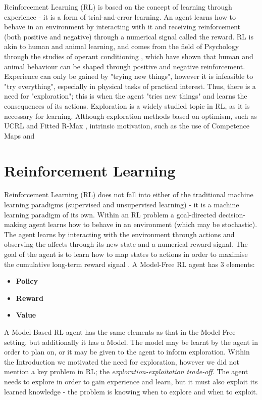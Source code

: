 Reinforcement Learning (RL) is based on the concept of learning through experience - it is a form of trial-and-error learning. An agent learns how to behave in an environment by interacting with it and receiving reinforcement (both positive and negative) through a numerical signal called the reward. RL is akin to human and animal learning, and comes from the field of Psychology through the studies of operant conditioning \cite{nla.cat-vn2770732}, which have shown that human and animal behaviour can be shaped through positive and negative reinforcement.
\\Experience can only be gained by "trying new things", however it is infeasible to "try everything", especially in physical tasks of practical interest. Thus, there is a need for "exploration"; this is when the agent "tries new things" and learns the consequences of its actions. Exploration is a widely studied topic in RL, as it is necessary for learning. Although exploration methods based on optimism, such as UCRL \cite{NIPS2006_c1b70d96} and Fitted R-Max \cite{SARA07-jong}, intrinsic motivation, such as the use of Competence Maps \cite{NIPS1991_e5f6ad6c} and 
\section{Reinforcement Learning}
Reinforcement Learning (RL) does not fall into either of the traditional machine learning paradigms (supervised and unsupervised learning) - it is a machine learning paradigm of its own. Within an RL problem a goal-directed decision-making agent learns how to behave in an environment (which may be stochastic). The agent learns by interacting with the environment through actions and observing the affects through its new state and a numerical reward signal. The goal of the agent is to learn how to map states to actions in order to maximise the cumulative long-term reward signal \cite{DBLP:books/lib/SuttonB98}.
A Model-Free RL agent has 3 elements:
\begin{itemize}
    \item \textbf{Policy}
    \item \textbf{Reward}
    \item \textbf{Value}
\end{itemize}
A Model-Based RL agent has the same elements as that in the Model-Free setting, but additionally it has a Model. The model may be learnt by the agent in order to plan on, or it may be given to the agent to inform exploration.
Within the Introduction we motivated the need for exploration, however we did not mention a key problem in RL; the \textit{exploration-exploitation trade-off}. The agent needs to explore in order to gain experience and learn, but it must also exploit its learned knowledge - the problem is knowing when to explore and when to exploit.
